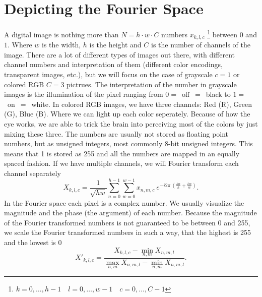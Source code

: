 \section{Depicting the Fourier Space}
A digital image is nothing more than $N=h\cdot w\cdot C$ numbers $x_{k,l,c}$
\footnote{$k=0,\dots, h-1\quad l=0,\dots,w-1\quad c=0,\dots,C-1$}
between $0$ and $1$.
Where $w$ is the width, $h$ is the height and $C$ is the number of channels of the image.
There are a lot of different types of images out there, with different channel numbers and interpretation
of them (different color encodings, transparent images, etc.), but we will focus on the
case of grayscale $c=1$ or colored RGB $C=3$ pictrues.
The interpretation of the number in grayscale images is the illumination of the pixel ranging from $0=$~off~$=$~black
to $1=$~on~$=$~white.
In colored RGB images, we have three channels: Red (R), Green (G), Blue (B). Where we can light up each color seperately.
Because of how the eye works, we are able to trick the brain into perceiving most of the colors by just
mixing these three.
The numbers are usually not stored as floating point numbers, but as unsigned integers, most commonly 8-bit unsigned integers.
This means that 1 is stored as 255 and all the numbers are mapped in an equally spaced fashion.
If we have multiple channels, we will Fourier transform each channel separately
\begin{equation}
    X_{k,l,c} = \frac{1}{\sqrt{hw}}\sum_{n=0}^{h-1}\sum_{w=0}^{w-1}x_{n,m,c} \ e^{-i{2\pi}\ \left(\!\frac{kn}{h}+\frac{lm}{w}\right)}.
\end{equation}
In the Fourier space each pixel is a complex number.
We usually visualize the magnitude and the phase (the argument) of each number.
Because the magnitude of the Fourier transformed numbers is not guaranteed
to be between 0 and 255, we scale the Fourier transformed numbers in such a way,
that the highest is 255 and the lowest is 0
\begin{equation}
    X'_{k,l,c} = \frac{X_{k,l,c}-\min_{n,m} X_{n,m,l}}{\max_{n,m} X_{n,m,l}-\min_{n,m} X_{n,m,l}}.
\end{equation}